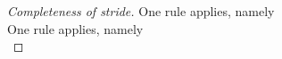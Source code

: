 \begin{proof}[Completeness of stride]
   {One rule applies, namely \\
   }
   {One rule applies, namely \\
   }





\end{proof}
